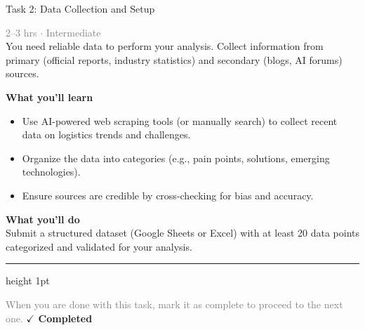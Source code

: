 \documentclass[10pt,a4paper]{article}
\begin{document}
\begin{taskbox}{Task 2: Data Collection and Setup}

    {\small \textcolor{gray}{2--3 hrs $\cdot$ Intermediate}}\\[12pt]

      
You need reliable data to perform your analysis. Collect information from primary (official reports, industry statistics) and secondary (blogs, AI forums) sources.  


\vspace{8pt}
{\large \textbf{\textcolor{brandLight}{What you'll learn}}}\\[4pt]  
\begin{itemize}
    \item Use AI-powered web scraping tools (or manually search) to collect recent data on logistics trends and challenges.  
    \item Organize the data into categories (e.g., pain points, solutions, emerging technologies).  
    \item Ensure sources are credible by cross-checking for bias and accuracy.  
\end{itemize}

\vspace{8pt}
{\large \textbf{\textcolor{brandLight}{What you'll do}}}\\[4pt]  
Submit a structured dataset (Google Sheets or Excel) with at least 20 data points categorized and validated for your analysis.\par

    \vspace{16pt}

    \textcolor{cardBorder}{\hrule height 1pt}\vspace{8pt}

    \small \textcolor{gray}{When you are done with this task, mark it as complete to proceed to the next one.} \hfill \textbf{\textcolor{brandDark}{$\checkmark$ Completed}}

\end{taskbox}
\end{document}
